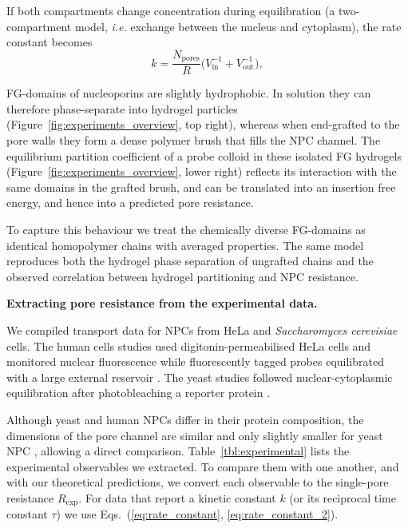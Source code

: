 \documentclass[10pt, a4paper]{article}
\begin{document}
\begin{multicols}{2}
If both compartments change concentration during equilibration
(a two-compartment model, \textit{i.e.} exchange between the nucleus and cytoplasm), the rate constant becomes
\begin{equation}
  k = \frac{N_{\text{pores}}}{R}
      \bigl(V_{\text{in}}^{-1}+V_{\text{out}}^{-1}\bigr),
  \label{eq:rate_constant_2}
\end{equation}

FG-domains of nucleoporins are slightly hydrophobic. 
In solution they can therefore phase-separate into hydrogel particles (Figure~\ref{fig:experiments_overview}, top right), whereas when end-grafted to the pore walls they form a dense polymer brush that fills the NPC channel.
The equilibrium partition coefficient of a probe colloid in these isolated FG hydrogels (Figure~\ref{fig:experiments_overview}, lower right) reflects its interaction with the same domains in the grafted brush, and can be translated into an insertion free energy, and hence into a predicted pore resistance.

To capture this behaviour we treat the chemically diverse FG-domains as identical homopolymer chains with averaged properties.  
The same model reproduces both the hydrogel phase separation of ungrafted chains and the observed correlation between hydrogel
partitioning and NPC resistance.


\textbf{Extracting pore resistance from the experimental data.}
    
We compiled transport data for NPCs from HeLa and \textit{Saccharomyces cerevisiae} cells.  
The human cells studies used digitonin-permeabilised HeLa cells and monitored nuclear fluorescence while fluorescently tagged probes equilibrated with a large external reservoir 
\cite{Ribbeck2001,Mohr2009,Frey2018}.  
The yeast studies followed nuclear-cytoplasmic equilibration after
photobleaching a reporter protein \cite{Popken2015,Timney2016}.

Although yeast and human NPCs differ in their protein composition, the dimensions of the pore channel are similar and only slightly smaller for yeast NPC \cite{Yang1998}, allowing a direct comparison.  
Table~\ref{tbl:experimental} lists the experimental observables we extracted. 
To compare them with one another, and with our theoretical predictions, we convert each observable to the single-pore resistance $R_{\text{exp}}$.  
For data that report a kinetic constant $k$ (or its reciprocal time constant $\tau$) we use Eqs.~(\ref{eq:rate_constant}, \ref{eq:rate_constant_2}).


\end{multicols}
\end{document}
